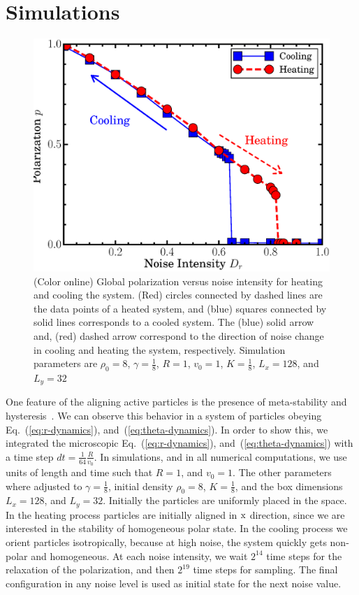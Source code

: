 \documentclass[reprint,floatfix,amsmath,amssymb,aps,pre,showkeys,showpacs,superscriptaddress]{revtex4-1}
\newcommand{\hl}[1]{\textcolor{hlcolor}{#1}}
\newcommand{\reqs}[2]{Eq.~(\ref{#1}), and~(\ref{#2})}
\begin{document}
\section{Simulations}
\label{section:simulations}

\begin{figure}
	\centering
	\includegraphics[width=\columnwidth]{Fig1_p-noise-sim}
	\caption{(Color online) Global polarization versus noise intensity for heating and cooling the system. (Red) circles connected by dashed lines are the data points of a heated system, and (blue) squares connected by solid lines corresponds to a cooled system. The (blue) solid arrow and, (red) dashed arrow correspond to the direction of noise change in cooling and heating the system, respectively. Simulation parameters are $\rho_0=8$, $\gamma=\tfrac{1}{8}$, $R=1$, $v_0=1$, $K=\tfrac{1}{8}$, $L_x=128$, and $L_y=32$}
	\label{fig:sim-hystersis}
\end{figure}

One feature of the aligning active particles is the presence of meta-stability and hysteresis~\cite{Gregoire2004,nagy2007,Chate2008,Chate2008a,Ihle2013invasion,solon2015from,solon2015flocking,solon2015pattern,thuroff2014numerical}. We can observe this behavior in a system of particles obeying \reqs{eq:r-dynamics}{eq:theta-dynamics}. In order to show this, we integrated \hl{the} microscopic \reqs{eq:r-dynamics}{eq:theta-dynamics} with \hl{a} time \hl{step} $dt=\tfrac{1}{64} \tfrac{R}{v_0}$. In simulations, and in all numerical computations, we use units of length and time such that $R=1$, and $v_0=1$. The other parameters where adjusted to $\gamma = \tfrac{1}{8}$, initial density $\rho_0=8$, $K = \tfrac{1}{8}$, and \hl{the} box dimensions $L_x=128$, and $L_y=32$. \hl{Initially the particles are uniformly placed in the space. In the heating process particles are initially aligned in ${\rm x}$ direction, since we are interested in the stability of homogeneous polar state. In the cooling process we orient particles isotropically, because at high noise, the system quickly gets non-polar and homogeneous. At each noise intensity, we wait $2^{14}$ time steps for the relaxation of the polarization, and then $2^{19}$ time steps for sampling. The final configuration in any noise level is used as initial state for the next noise value.}
\end{document}
